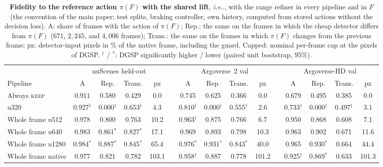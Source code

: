 \documentclass[10pt,letterpaper]{article}
\makeatletter
\DeclareRobustCommand\onedot{\futurelet\@let@token\@onedot}
\def\@onedot{\ifx\@let@token.\else.\null\fi\xspace}
\def\ie{\emph{i.e}\onedot} \def\Ie{\emph{I.e}\onedot}
\newcommand{\method}{DGSP\xspace}
\newcommand{\full}{F}
\newcommand{\policy}{\pi}
\theoremstyle{remark}
\theoremstyle{plain}
\theoremstyle{definition}
\makeatother
\begin{document}
\begin{table}[!htbp]
\centering
\caption{\textbf{Fidelity to the reference action $\policy(\full)$ with the shared lift}, \ie, with the range refiner in every pipeline and in $\full$ (the convention of the main paper; test splits, braking controller, own history, computed from stored actions without the decision loss). A: share of frames with the action of $\policy(\full)$; Rep.: the same on the frames in which the cheap detector differs from $\policy(\full)$ ($671$, $2{,}245$, and $4{,}006$ frames); Trans.: the same on the frames in which $\policy(\full)$ changes from the previous frame; px: detector-input pixels in \% of the native frame, including the guard. Capped: nominal per-frame cap at the pixels of \method. $^{\dagger}$ / $^{*}$: \method significantly higher / lower (paired unit bootstrap, $95\%$).}
\label{tab:fidelity_lift}
\scriptsize
\setlength{\tabcolsep}{2.2pt}
\begin{tabular}{@{}lcccccccccccccc@{}}
\toprule
 & \multicolumn{4}{c}{nuScenes held-out} & & \multicolumn{4}{c}{Argoverse~2 val} & & \multicolumn{4}{c}{Argoverse-HD val} \\
\cmidrule(lr){2-5}\cmidrule(lr){7-10}\cmidrule(l){12-15}
Pipeline & A & Rep. & Trans. & px & & A & Rep. & Trans. & px & & A & Rep. & Trans. & px \\
\midrule
Always \textsc{keep} & 0.911 & 0.580 & 0.429 & 0.0 &  & 0.745 & 0.625 & 0.366 & 0.0 &  & 0.679 & 0.495 & 0.385 & 0.0 \\
u320 & 0.927$^{\dagger}$ & 0.000$^{\dagger}$ & 0.653$^{\dagger}$ & 4.3 &  & 0.810$^{\dagger}$ & 0.000$^{\dagger}$ & 0.555$^{\dagger}$ & 2.6 &  & 0.733$^{\dagger}$ & 0.000$^{\dagger}$ & 0.497$^{\dagger}$ & 3.1 \\
\midrule
Whole frame u512 & 0.978 & 0.800 & 0.763 & 10.2 &  & 0.963$^{\dagger}$ & 0.875 & 0.766 & 6.7 &  & 0.950 & 0.868 & 0.608 & 7.1 \\
Whole frame u640 & 0.983 & 0.861$^{*}$ & 0.827$^{*}$ & 17.1 &  & 0.969 & 0.893 & 0.798 & 10.3 &  & 0.963 & 0.902 & 0.671 & 11.6 \\
Whole frame u1280 & 0.984$^{*}$ & 0.887$^{*}$ & 0.845$^{*}$ & 65.4 &  & 0.976$^{*}$ & 0.931$^{*}$ & 0.843$^{*}$ & 40.0 &  & 0.965 & 0.930$^{*}$ & 0.664 & 44.4 \\
Whole frame native & 0.977 & 0.821 & 0.782 & 103.1 &  & 0.958$^{\dagger}$ & 0.887 & 0.778 & 101.2 &  & 0.925$^{\dagger}$ & 0.869$^{*}$ & 0.633 & 101.3 \\

\end{tabular}
\end{table}
\end{document}
